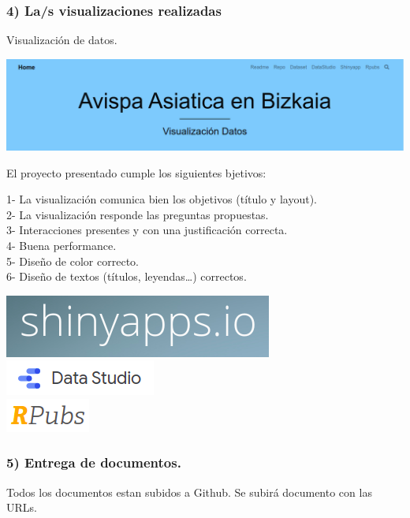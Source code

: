 \documentclass[
]{article}
\begin{document}
\pagebreak

\hypertarget{las-visualizaciones-realizadas}{%
\subsubsection{4) La/s visualizaciones
realizadas}\label{las-visualizaciones-realizadas}}

Visualización de datos.

\href{https://zumaiauoc.github.io/vespa/}{\includegraphics{img/vespa.png}}

El proyecto presentado cumple los siguientes bjetivos:

1- La visualización comunica bien los objetivos (título y layout).\\
2- La visualización responde las preguntas propuestas.\\
3- Interacciones presentes y con una justificación correcta.\\
4- Buena performance.\\
5- Diseño de color correcto.\\
6- Diseño de textos (títulos, leyendas\ldots) correctos.

\href{https://oscar-rojo-martin.shinyapps.io/Vespa/}{\includegraphics{img/shinyapp.png}}\\
\href{https://oscar-rojo-martin.shinyapps.io/Vespa/}{\includegraphics{img/datastudio.png}}\\
\href{https://rpubs.com/zumaia/vespa}{\includegraphics{img/rpubs.png}}

\pagebreak

\hypertarget{entrega-de-documentos.}{%
\subsubsection{5) Entrega de documentos.}\label{entrega-de-documentos.}}

Todos los documentos estan subidos a Github. Se subirá documento con las
URLs.
\end{document}
